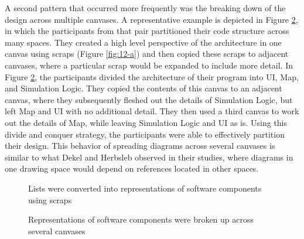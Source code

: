 A second pattern that occurred more frequently was the breaking down of the design across multiple canvases. A representative example is depicted in Figure \ref{fig:12}, in which the participants from that pair partitioned their code structure across many spaces. They created a high level perspective of the architecture in one canvas using scraps (Figure \ref{fig:12-a}) and then copied these scraps to adjacent canvases, where a particular scrap would be expanded to include more detail. In Figure \ref{fig:12}, the participants divided the architecture of their program into UI, Map, and Simulation Logic. They copied the contents of this canvas to an adjacent canvas, where they subsequently fleshed out the details of Simulation Logic, but left Map and UI with no additional detail. They then used a third canvas to work out the details of Map, while leaving Simulation Logic and UI as is. Using this divide and conquer strategy, the participants were able to effectively partition their design. This behavior of spreading diagrams across several canvases is similar to what Dekel and Herbsleb \citep{dekel2007notation} observed in their studies, where diagrams in one drawing space would depend on references located in other spaces. 

\begin{figure}%
  \centering
   \caption {Lists were converted into representations of software components using scraps}
   \label{fig:11}
\end{figure}%

\begin{figure}%
  \centering
   \caption {Representations of software components were broken up across several canvases}
   \label{fig:12}
\end{figure}%

